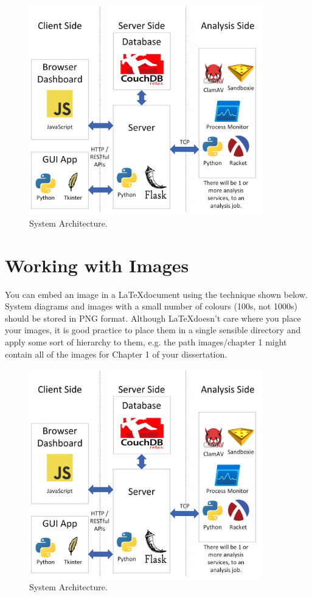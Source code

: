 \begin{figure}[h!]
    \includegraphics[width=0.9\textwidth]{images/architecture.png}
    \caption{System Architecture.}
    \label{image:sysArchitecture}
\end{figure}



\section{Working with Images}
You can embed an image in a \LaTeX document using the technique shown below. System diagrams and images with a small number of colours (100s, not 1000s) should be stored in PNG format. Although \LaTeX doesn't care where you place your images, it is good practice to place them in a single sensible directory and apply some sort of hierarchy to them, e.g. the path images/chapter 1 might contain all of the images for Chapter 1 of your dissertation.

\begin{figure}[h!]
    \includegraphics[width=0.9\textwidth]{images/architecture.png}
    \caption{System Architecture.}
    \label{image:sysArchitecture}
\end{figure}


